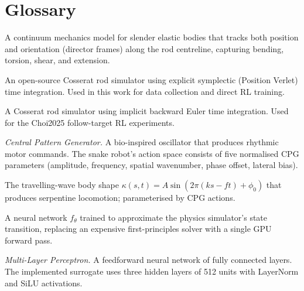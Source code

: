 \documentclass[11pt]{article}
\begin{document}
\tableofcontents
\newpage

\section*{Glossary}
\label{sec:glossary}

\begin{description}[style=nextline, leftmargin=3.2cm, labelwidth=3cm, font=\normalfont\bfseries]

  \item[Cosserat rod]
    A continuum mechanics model for slender elastic bodies that tracks both position and orientation (director frames) along the rod centreline, capturing bending, torsion, shear, and extension.

  \item[PyElastica]
    An open-source Cosserat rod simulator using explicit symplectic (Position Verlet) time integration. Used in this work for data collection and direct RL training.

  \item[DisMech]
    A Cosserat rod simulator using implicit backward Euler time integration. Used for the Choi2025 follow-target RL experiments.

  \item[CPG]
    \emph{Central Pattern Generator.} A bio-inspired oscillator that produces rhythmic motor commands. The snake robot's action space consists of five normalised CPG parameters (amplitude, frequency, spatial wavenumber, phase offset, lateral bias).

  \item[Serpenoid curve]
    The travelling-wave body shape $\kappa(s,t) = A\sin(2\pi(ks - ft) + \phi_0)$ that produces serpentine locomotion; parameterised by CPG actions.

  \item[Surrogate model]
    A neural network $f_\theta$ trained to approximate the physics simulator's state transition, replacing an expensive first-principles solver with a single GPU forward pass.

  \item[MLP]
    \emph{Multi-Layer Perceptron.} A feedforward neural network of fully connected layers. The implemented surrogate uses three hidden layers of 512 units with LayerNorm and SiLU activations.


\end{description}
\end{document}
